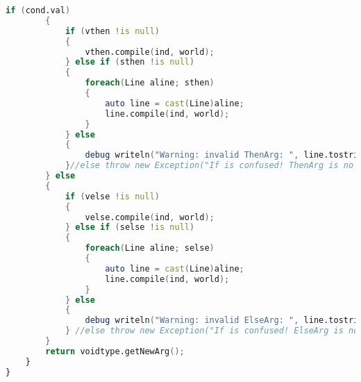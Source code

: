 \documentclass[russian,utf8,emptystyle]{eskdtext}
\begin{document}
\begin{lstlisting}[language=D]
        if (cond.val)
        {
            if (vthen !is null)
            {
                vthen.compile(ind, world);
            } else if (sthen !is null)
            {
                foreach(Line aline; sthen)
                {
                    auto line = cast(Line)aline;
                    line.compile(ind, world);
                }
            } else
            {
                debug writeln("Warning: invalid ThenArg: ", line.tostring);
            }//else throw new Exception("If is confused! ThenArg is no line, no scope. " ~ line.tostring);
        } else
        {
            if (velse !is null)
            {
                velse.compile(ind, world);
            } else if (selse !is null)
            {
                foreach(Line aline; selse)
                {
                    auto line = cast(Line)aline;
                    line.compile(ind, world);
                }               
            } else
            {
                debug writeln("Warning: invalid ElseArg: ", line.tostring);
            } //else throw new Exception("If is confused! ElseArg is no line, no scope" ~ line.tostring);           
        }
        return voidtype.getNewArg();
    }   
}

\end{lstlisting}
\end{document}
